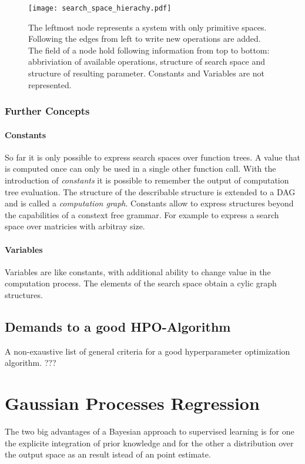 \documentclass[english]{article}
\begin{document}

\begin{figure}
\texttt{[image: search\_space\_hierachy.pdf]}

  \caption{The leftmost node represents a system with only primitive spaces. Following the edges from left to write new operations are added. The field of a node hold following information from top to bottom: abbriviation of available operations, structure of search space and structure of resulting parameter. Constants and Variables are not represented.}
  \label{fig_spaces}
\end{figure}



\subsubsection{Further Concepts}



\paragraph{Constants}
So far it is only possible to express search spaces over function trees.
A value that is computed once can only be used in a single other function call. With the introduction of \textit{constants} it is possible to remember the output of computation tree evaluation.
The structure of the describable structure is extended to a DAG and is called a \textit{computation graph}.
Constants allow to express structures beyond the capabilities of a constext free grammar. For example to express a search space over matricies with arbitray size.

\paragraph{Variables}
Variables are like constants, with additional ability to change value in the computation process. The elements of the search space obtain a cylic graph structures.

\subsection{Demands to a good HPO-Algorithm}
A non-exaustive list of general criteria for a good hyperparameter optimization algorithm. ???

\section{Gaussian Processes Regression}
The two big advantages of a Bayesian approach to supervised learning is for one the explicite integration of prior knowledge and for the other a distribution over the output space as an result istead of an point estimate.
\end{document}
